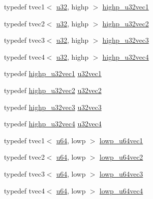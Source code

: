 \begin{DoxyCompactItemize}
\item 
typedef tvec1$<$ \hyperlink{group__gtc__type__precision_ga54e837745059fd29017bed71cfa0a8db}{u32}, highp $>$ \hyperlink{namespaceglm_a5d7ddaf3668bab7b214ff24a0196d678}{highp\+\_\+u32vec1}
\item 
typedef tvec2$<$ \hyperlink{group__gtc__type__precision_ga54e837745059fd29017bed71cfa0a8db}{u32}, highp $>$ \hyperlink{namespaceglm_a04892ac2070556582e80970024bfba5b}{highp\+\_\+u32vec2}
\item 
typedef tvec3$<$ \hyperlink{group__gtc__type__precision_ga54e837745059fd29017bed71cfa0a8db}{u32}, highp $>$ \hyperlink{namespaceglm_a51f3fb62251b844d00526542257b0a0d}{highp\+\_\+u32vec3}
\item 
typedef tvec4$<$ \hyperlink{group__gtc__type__precision_ga54e837745059fd29017bed71cfa0a8db}{u32}, highp $>$ \hyperlink{namespaceglm_ad6f92f734328c938625f719cec206a15}{highp\+\_\+u32vec4}
\item 
typedef \hyperlink{namespaceglm_a5d7ddaf3668bab7b214ff24a0196d678}{highp\+\_\+u32vec1} \hyperlink{group__gtc__type__precision_ga09dd72852808c32ba398674736b9672a}{u32vec1}
\item 
typedef \hyperlink{namespaceglm_a04892ac2070556582e80970024bfba5b}{highp\+\_\+u32vec2} \hyperlink{group__gtc__type__precision_gad3a81c0d5a6941bb9ffdc9fa8611b426}{u32vec2}
\item 
typedef \hyperlink{namespaceglm_a51f3fb62251b844d00526542257b0a0d}{highp\+\_\+u32vec3} \hyperlink{group__gtc__type__precision_ga16b26751ba6b83c8a0226b9834d73fdc}{u32vec3}
\item 
typedef \hyperlink{namespaceglm_ad6f92f734328c938625f719cec206a15}{highp\+\_\+u32vec4} \hyperlink{group__gtc__type__precision_ga6e966cda0025699449a36b41f1787927}{u32vec4}
\item 
typedef tvec1$<$ \hyperlink{group__gtc__type__precision_ga71cedd4972f9cb1a5e14dfe5ab83ecd7}{u64}, lowp $>$ \hyperlink{namespaceglm_abb476bd46127c5148bf1d00cea62d064}{lowp\+\_\+u64vec1}
\item 
typedef tvec2$<$ \hyperlink{group__gtc__type__precision_ga71cedd4972f9cb1a5e14dfe5ab83ecd7}{u64}, lowp $>$ \hyperlink{namespaceglm_afeb976720a93f60bb03600f1880d6132}{lowp\+\_\+u64vec2}
\item 
typedef tvec3$<$ \hyperlink{group__gtc__type__precision_ga71cedd4972f9cb1a5e14dfe5ab83ecd7}{u64}, lowp $>$ \hyperlink{namespaceglm_aab88e6c0a19cd02475818032deae529d}{lowp\+\_\+u64vec3}
\item 
typedef tvec4$<$ \hyperlink{group__gtc__type__precision_ga71cedd4972f9cb1a5e14dfe5ab83ecd7}{u64}, lowp $>$ \hyperlink{namespaceglm_a065789a607d0dedd298461844a57949a}{lowp\+\_\+u64vec4}

\end{DoxyCompactItemize}
